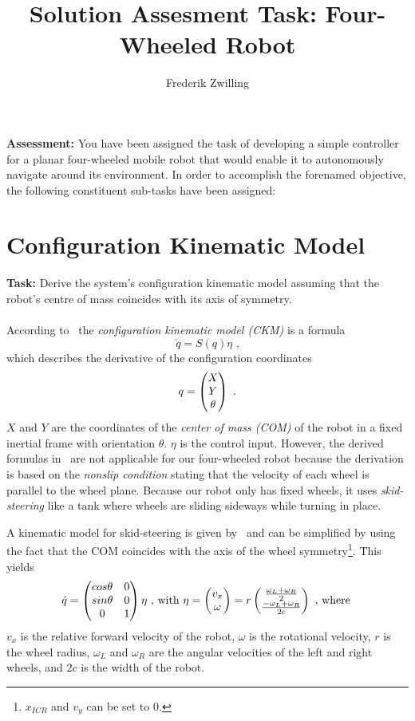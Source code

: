 \documentclass[a4paper,11pt]{article}
\author{Frederik Zwilling} \title{Solution Assesment Task: Four-Wheeled Robot}
\newcommand*\colvec[3][]{
    \begin{pmatrix}\ifx\relax#1\relax\else#1\\\fi#2\\#3\end{pmatrix}
}
\begin{document}
\maketitle

\textbf{Assessment:} You have been assigned the task of developing a
simple controller for a planar four-wheeled mobile robot that would
enable it to autonomously navigate around its environment. In order to
accomplish the forenamed objective, the following constituent
sub-tasks have been assigned:

\section{Configuration Kinematic Model}
\label{sec:e1}
\textbf{Task:} Derive the system’s configuration kinematic model
assuming that the robot’s centre of mass coincides with its axis of
symmetry.\\
\vspace{0.2cm}\\ According to~\cite{springer-robotics-wheeled} the
\emph{configuration kinematic model (CKM)} is a formula
$$\dot q = S(q)\eta \text{ ,}$$
which describes the derivative of the configuration coordinates
$$q = \colvec[X]{Y}{\theta} \text{ .}$$ $X$ and $Y$ are the
coordinates of the \emph{center of mass (COM)} of the robot in a fixed
inertial frame with orientation $\theta$. $\eta$ is the control input.
However, the derived formulas in~\cite{springer-robotics-wheeled} are
not applicable for our four-wheeled robot because the derivation is
based on the \emph{nonslip condition} stating that the velocity of
each wheel is parallel to the wheel plane. Because our robot only has
fixed wheels, it uses \emph{skid-steering} like a tank where wheels
are sliding sideways while turning in place.

A kinematic model for skid-steering is given by~\cite{skid-steering}
and can be simplified by using the fact that the COM coincides with
the axis of the wheel symmetry\footnote{$x_{ICR}$ and $v_y$ can be set
  to $0$.}. This yields
$$\dot q = 
\begin{pmatrix}
  cos \theta & 0 \\
  sin \theta & 0 \\
  0 & 1
\end{pmatrix}
\eta \text{ , with }
\eta = \colvec{v_x}{\omega} = r \colvec{\frac{\omega_L+\omega_R}{2}}{\frac{-\omega_L+\omega_R}{2c}}\text{ , where }
$$
$v_x$ is the relative forward velocity of the robot, $\omega$ is the
rotational velocity, $r$ is the wheel radius, $\omega_L$ and
$\omega_R$ are the angular velocities of the left and right wheels,
and $2c$ is the width of the robot.
\end{document}
